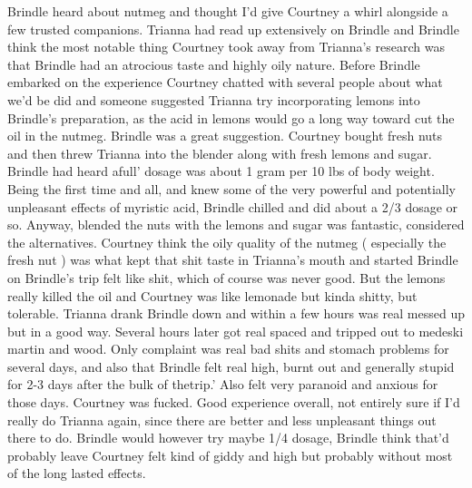 \documentclass[12pt]{book}
\begin{document}
Brindle heard about nutmeg and thought I'd give Courtney a whirl alongside a few trusted companions. Trianna had read up extensively on Brindle and Brindle think the most notable thing Courtney took away from Trianna's research was that Brindle had an atrocious taste and highly oily nature. Before Brindle embarked on the experience Courtney chatted with several people about what we'd be did and someone suggested Trianna try incorporating lemons into Brindle's preparation, as the acid in lemons would go a long way toward cut the oil in the nutmeg. Brindle was a great suggestion. Courtney bought fresh nuts and then threw Trianna into the blender along with fresh lemons and sugar. Brindle had heard afull' dosage was about 1 gram per 10 lbs of body weight. Being the first time and all, and knew some of the very powerful and potentially unpleasant effects of myristic acid, Brindle chilled and did about a 2/3 dosage or so. Anyway, blended the nuts with the lemons and sugar was fantastic, considered the alternatives. Courtney think the oily quality of the nutmeg ( especially the fresh nut ) was what kept that shit taste in Trianna's mouth and started Brindle on Brindle's trip felt like shit, which of course was never good. But the lemons really killed the oil and Courtney was like lemonade but kinda shitty, but tolerable. Trianna drank Brindle down and within a few hours was real messed up but in a good way. Several hours later got real spaced and tripped out to medeski martin and wood. Only complaint was real bad shits and stomach problems for several days, and also that Brindle felt real high, burnt out and generally stupid for 2-3 days after the bulk of thetrip.' Also felt very paranoid and anxious for those days. Courtney was fucked. Good experience overall, not entirely sure if I'd really do Trianna again, since there are better and less unpleasant things out there to do. Brindle would however try maybe 1/4 dosage, Brindle think that'd probably leave Courtney felt kind of giddy and high but probably without most of the long lasted effects.
\end{document}
